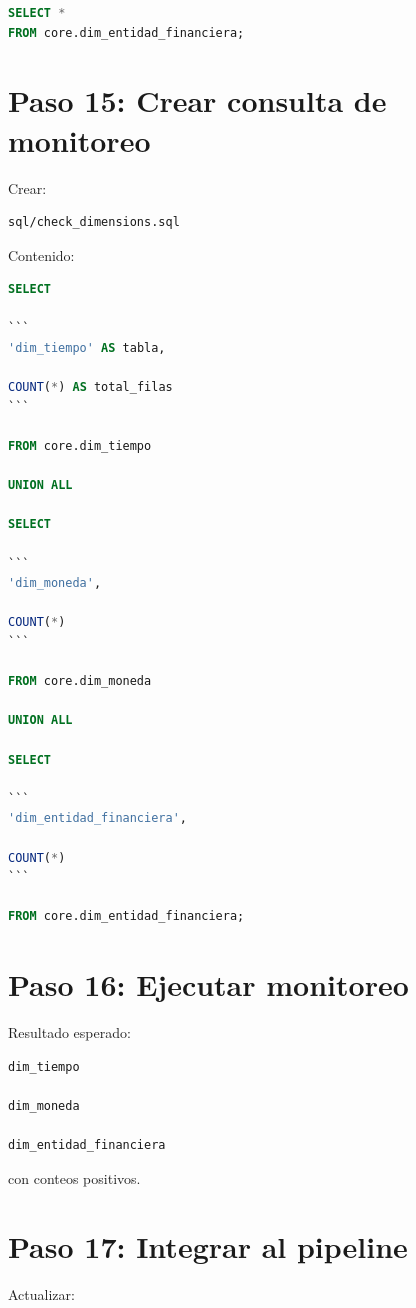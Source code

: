 \begin{lstlisting}[language=SQL]
SELECT *
FROM core.dim_entidad_financiera;
\end{lstlisting}

\section{Paso 15: Crear consulta de monitoreo}

Crear:

\begin{verbatim}
sql/check_dimensions.sql
\end{verbatim}

Contenido:

\begin{lstlisting}[language=SQL]
SELECT

```
'dim_tiempo' AS tabla,

COUNT(*) AS total_filas
```

FROM core.dim_tiempo

UNION ALL

SELECT

```
'dim_moneda',

COUNT(*)
```

FROM core.dim_moneda

UNION ALL

SELECT

```
'dim_entidad_financiera',

COUNT(*)
```

FROM core.dim_entidad_financiera;
\end{lstlisting}

\section{Paso 16: Ejecutar monitoreo}

Resultado esperado:

\begin{verbatim}
dim_tiempo

dim_moneda

dim_entidad_financiera
\end{verbatim}

con conteos positivos.

\section{Paso 17: Integrar al pipeline}

Actualizar:

